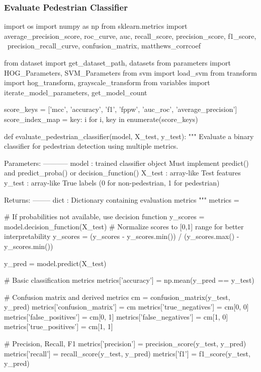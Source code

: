 \subsubsection{Evaluate Pedestrian Classifier}\label{appendix:evaluate_metrics}
\begin{pythoncode}
import os
import numpy as np
from sklearn.metrics import average_precision_score, roc_curve, auc, recall_score, precision_score, f1_score, \
    precision_recall_curve, confusion_matrix, matthews_corrcoef

from dataset import get_dataset_path, datasets
from parameters import HOG_Parameters, SVM_Parameters
from svm import load_svm
from transform import hog_transform, grayscale_transform
from variables import iterate_model_parameters, get_model_count

score_keys = ['mcc', 'accuracy', 'f1', 'fppw', 'auc_roc', 'average_precision']
score_index_map = {key: i for i, key in enumerate(score_keys)}

def evaluate_pedestrian_classifier(model, X_test, y_test):
    """
    Evaluate a binary classifier for pedestrian detection using multiple metrics.

    Parameters:
    -----------
    model : trained classifier object
        Must implement predict() and predict_proba() or decision_function()
    X_test : array-like
        Test features
    y_test : array-like
        True labels (0 for non-pedestrian, 1 for pedestrian)

    Returns:
    --------
    dict : Dictionary containing evaluation metrics
    """
    metrics = {}

    # If probabilities not available, use decision function
    y_scores = model.decision_function(X_test)
    # Normalize scores to [0,1] range for better interpretability
    y_scores = (y_scores - y_scores.min()) / (y_scores.max() - y_scores.min())

    y_pred = model.predict(X_test)

    # Basic classification metrics
    metrics['accuracy'] = np.mean(y_pred == y_test)

    # Confusion matrix and derived metrics
    cm = confusion_matrix(y_test, y_pred)
    metrics['confusion_matrix'] = cm
    metrics['true_negatives'] = cm[0, 0]
    metrics['false_positives'] = cm[0, 1]
    metrics['false_negatives'] = cm[1, 0]
    metrics['true_positives'] = cm[1, 1]

    # Precision, Recall, F1
    metrics['precision'] = precision_score(y_test, y_pred)
    metrics['recall'] = recall_score(y_test, y_pred)
    metrics['f1'] = f1_score(y_test, y_pred)


\end{pythoncode}
